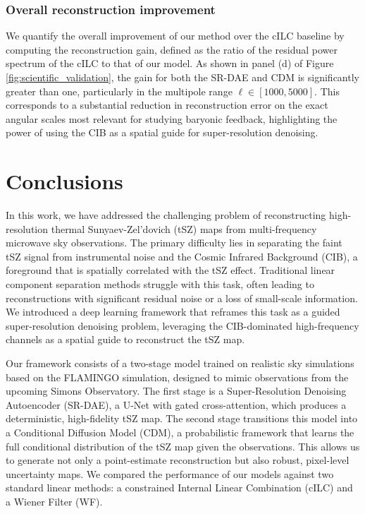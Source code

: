 \documentclass[]{article}
\begin{document}
\subsubsection{Overall reconstruction improvement}
We quantify the overall improvement of our method over the cILC baseline by computing the reconstruction gain, defined as the ratio of the residual power spectrum of the cILC to that of our model. As shown in panel (d) of Figure \ref{fig:scientific_validation}, the gain for both the SR-DAE and CDM is significantly greater than one, particularly in the multipole range $\ell \in [1000, 5000]$. This corresponds to a substantial reduction in reconstruction error on the exact angular scales most relevant for studying baryonic feedback, highlighting the power of using the CIB as a spatial guide for super-resolution denoising.

\section{Conclusions}
\label{sec:conclusions}


In this work, we have addressed the challenging problem of reconstructing high-resolution thermal Sunyaev-Zel'dovich (tSZ) maps from multi-frequency microwave sky observations. The primary difficulty lies in separating the faint tSZ signal from instrumental noise and the Cosmic Infrared Background (CIB), a foreground that is spatially correlated with the tSZ effect. Traditional linear component separation methods struggle with this task, often leading to reconstructions with significant residual noise or a loss of small-scale information. We introduced a deep learning framework that reframes this task as a guided super-resolution denoising problem, leveraging the CIB-dominated high-frequency channels as a spatial guide to reconstruct the tSZ map.

Our framework consists of a two-stage model trained on realistic sky simulations based on the FLAMINGO simulation, designed to mimic observations from the upcoming Simons Observatory. The first stage is a Super-Resolution Denoising Autoencoder (SR-DAE), a U-Net with gated cross-attention, which produces a deterministic, high-fidelity tSZ map. The second stage transitions this model into a Conditional Diffusion Model (CDM), a probabilistic framework that learns the full conditional distribution of the tSZ map given the observations. This allows us to generate not only a point-estimate reconstruction but also robust, pixel-level uncertainty maps. We compared the performance of our models against two standard linear methods: a constrained Internal Linear Combination (cILC) and a Wiener Filter (WF).
\end{document}

